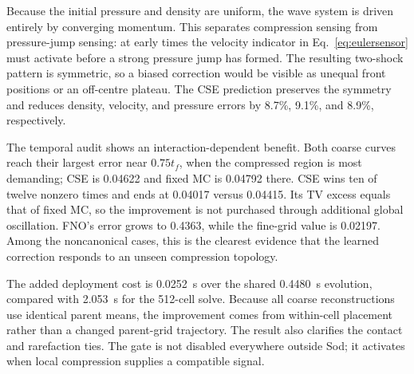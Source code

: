 \documentclass[10pt,twocolumn]{article}
\begin{document}
Because the initial pressure and density are uniform, the wave system is driven entirely by converging momentum. This separates compression sensing from pressure-jump sensing: at early times the velocity indicator in Eq.~\eqref{eq:eulersensor} must activate before a strong pressure jump has formed. The resulting two-shock pattern is symmetric, so a biased correction would be visible as unequal front positions or an off-centre plateau. The CSE prediction preserves the symmetry and reduces density, velocity, and pressure errors by 8.7\%, 9.1\%, and 8.9\%, respectively.

The temporal audit shows an interaction-dependent benefit. Both coarse curves reach their largest error near $0.75t_f$, when the compressed region is most demanding; CSE is 0.04622 and fixed MC is 0.04792 there. CSE wins ten of twelve nonzero times and ends at 0.04017 versus 0.04415. Its TV excess equals that of fixed MC, so the improvement is not purchased through additional global oscillation. FNO's error grows to 0.4363, while the fine-grid value is 0.02197. Among the noncanonical cases, this is the clearest evidence that the learned correction responds to an unseen compression topology.

The added deployment cost is 0.0252~s over the shared 0.4480~s evolution, compared with 2.053~s for the 512-cell solve. Because all coarse reconstructions use identical parent means, the improvement comes from within-cell placement rather than a changed parent-grid trajectory. The result also clarifies the contact and rarefaction ties. The gate is not disabled everywhere outside Sod; it activates when local compression supplies a compatible signal.
\end{document}
